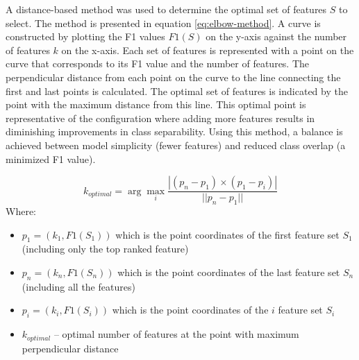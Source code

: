 A distance-based method was used to determine the optimal set of features $S$ to select. The method is presented in equation \eqref{eq:elbow-method}. A curve is constructed by plotting the F1 values $F1(S)$ on the y-axis against the number of features $k$ on the x-axis. Each set of features is represented with a point on the curve that corresponds to its F1 value and the number of features. The perpendicular distance from each point on the curve to the line connecting the first and last points is calculated. The optimal set of features is indicated by the point with the maximum distance from this line. This optimal point is representative of the configuration where adding more features results in diminishing improvements in class separability. Using this method, a balance is achieved between model simplicity (fewer features) and reduced class overlap (a minimized F1 value).

\begin{equation}
    k_{optimal} = \arg\max_{i} \frac{|(p_n - p_1) \times (p_1 - p_i)|}{||p_n - p_1||}
    \label{eq:elbow-method}
\end{equation}
Where:
\begin{itemize}
    \item $p_1 = (k_1, F1(S_1))$ which is the point coordinates of the first feature set $S_1$ (including only the top ranked feature)
    \item $p_n = (k_n, F1(S_n))$ which is the point coordinates of the last feature set $S_n$ (including all the features)
    \item $p_i = (k_i, F1(S_i))$ which is the point coordinates of the $i$ feature set $S_i$
    \item $k_{optimal}$ -- optimal number of features at the point with maximum perpendicular distance
\end{itemize}
\vspace{2em}

